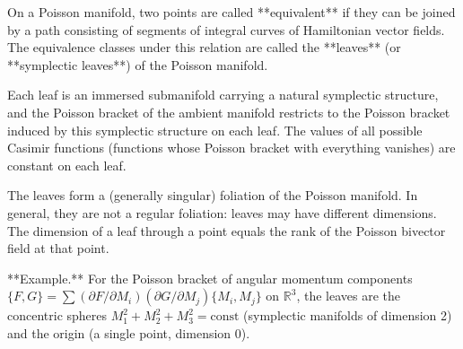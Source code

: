 On a Poisson manifold, two points are called **equivalent** if they can be joined by a path consisting of segments of integral curves of Hamiltonian vector fields. The equivalence classes under this relation are called the **leaves** (or **symplectic leaves**) of the Poisson manifold.

Each leaf is an immersed submanifold carrying a natural symplectic structure, and the Poisson bracket of the ambient manifold restricts to the Poisson bracket induced by this symplectic structure on each leaf. The values of all possible Casimir functions (functions whose Poisson bracket with everything vanishes) are constant on each leaf.

The leaves form a (generally singular) foliation of the Poisson manifold. In general, they are not a regular foliation: leaves may have different dimensions. The dimension of a leaf through a point equals the rank of the Poisson bivector field at that point.

**Example.** For the Poisson bracket of angular momentum components $\{F, G\} = \sum (\partial F/\partial M_i)(\partial G/\partial M_j)\{M_i, M_j\}$ on $\mathbb{R}^3$, the leaves are the concentric spheres $M_1^2 + M_2^2 + M_3^2 = \text{const}$ (symplectic manifolds of dimension 2) and the origin (a single point, dimension 0).
